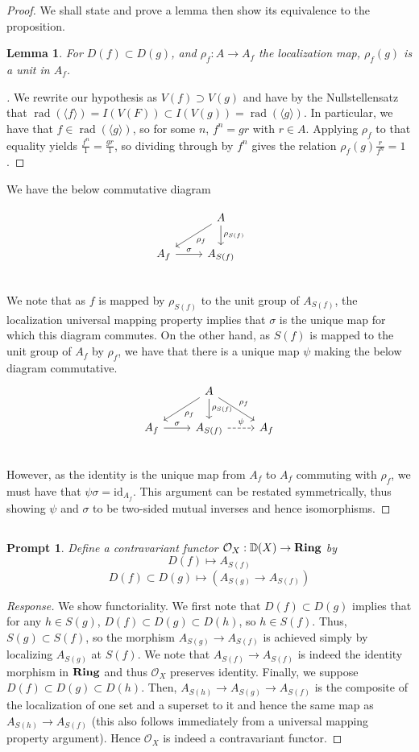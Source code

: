 \documentclass[english]{article}
\DeclareMathOperator{\rad}{rad}
\newcommand{\DD}{\mathbb{D}}
\newcommand{\OO}{\mathcal{O}}
\newenvironment{subproof}[1][\proofname]{%
	\renewcommand{\qedsymbol}{$\blacksquare$}%
	\begin{proof}[#1]%
	}{%
	\end{proof}%
}
\newcommand{\prt}[1]{\setcounter{subsection}{#1-1}\subsection{}}
\newtheorem*{lemma*}{Lemma}
\newtheorem*{prompt*}{Prompt}
\theoremstyle{remark}
\theoremstyle{definition}
\newcommand{\idl}[1]{\langle #1 \rangle}
\newcommand{\id}{\mathrm{id}}
\newcommand{\cat}[1]{{\mathrm{\bf{#1}}}}
\begin{document}
\begin{proof}
 We shall state and prove a lemma then show its equivalence to the proposition.
 \begin{lemma*}
 	For $D(f)\subset D(g)$, and $\rho_f:A\to A_f$ the localization map, $\rho_f(g)$ is a unit in $A_f$.
 \end{lemma*}
\begin{subproof}
We rewrite our hypothesis as $V(f)\supset V(g)$ and have by the Nullstellensatz that $\rad(\langle f \rangle)=I(V(F))\subset I(V(g))=\rad(\idl{g})$. In particular, we have that $f\in \rad(\idl{g})$, so for some $n$, $f^n=gr$ with $r\in A$. Applying $\rho_f$ to that equality yields $\frac{f^n}{1}=\frac{gr}{1}$, so dividing through by $f^n$ gives the relation $\rho_f(g)\frac{r}{f^n}=1$.
\end{subproof}
We have the below commutative diagram

	\[ 
	\begin{tikzcd}
	&A \arrow{ld}{\rho_f} \arrow{d}{\rho_{S(f)}} &  \\
	A_{f} \arrow{r}{\sigma} & A_{S(f)} \\
	\end{tikzcd}
	\]
We note that as $f$ is mapped by $\rho_{S(f)}$ to the unit group of $A_{S(f)}$, the localization universal mapping property implies that $\sigma$ is the unique map for which this diagram commutes. On the other hand, as $S(f)$ is mapped to the unit group of $A_f$ by $\rho_f$, we have that there is a unique map $\psi$ making the below diagram commutative.
	\[ 
\begin{tikzcd}
&A \arrow{ld}{\rho_f} \arrow{d}{\rho_{S(f)}} \arrow{rd}{\rho_f} &  \\
A_{f} \arrow{r}{\sigma} & A_{S(f)} \arrow[dashrightarrow]{r}{\psi} &A_f \\
\end{tikzcd}
\]
However, as the identity is the unique map from $A_f$ to $A_f$ commuting with $\rho_f$, we must have that $\psi\sigma=\id_{A_f}$. This argument can be restated symmetrically, thus showing $\psi$ and $\sigma$ to be two-sided mutual inverses and hence isomorphisms.
\end{proof}
\prt{3}\begin{prompt*}
	Define a contravariant functor $\OO_X:\DD(X)\to \cat{Ring}$ by $$D(f)\mapsto A_{S(f)}$$
	$$D(f)\subset D(g)\mapsto( A_{S(g)}\to A_{S(f)})$$
\end{prompt*}
\begin{proof}[Response]
	We show functoriality. We first note that $D(f)\subset D(g)$ implies that for any $h\in S(g)$, $D(f)\subset D(g)\subset D(h)$, so $h\in S(f)$. Thus, $S(g)\subset S(f)$, so the morphism $A_{S(g)}\to A_{S(f)}$ is achieved simply by localizing $A_{S(g)}$ at $S(f)$. We note that $A_{S(f)}\to A_{S(f)}$ is indeed the identity morphism in $\cat{Ring}$ and thus $\OO_X$ preserves identity. Finally, we suppose $D(f)\subset D(g)\subset D(h)$. Then, $A_{S(h)}\to A_{S(g)}\to A_{S(f)}$ is the composite of the localization of one set and a superset to it and hence the same map as $A_{S(h)}\to A_{S(f)}$ (this also follows immediately from a universal mapping property argument). Hence $\OO_X$ is indeed a contravariant functor.
\end{proof}
\end{document}
